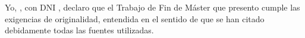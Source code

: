 Yo, \textbf{\myName}, con DNI \dni, declaro que
el Trabajo de Fin de Máster que presento cumple las exigencias de originalidad,
entendida en el sentido de que se han citado debidamente todas las fuentes
utilizadas.

\vspace{6cm}


%
%
%
%
%
%
%
%
%
%
%
%

%
%
%
%
%
%
